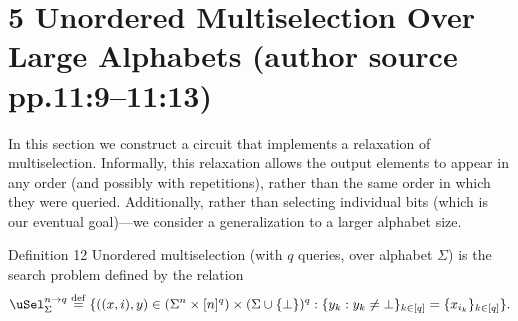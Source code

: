 \section*{5 Unordered Multiselection Over Large Alphabets (author source pp.11:9--11:13)}
In this section we construct a circuit that implements a relaxation of multiselection. Informally, this relaxation allows the output elements to appear in any order (and possibly with repetitions), rather than the same order in which they were queried. Additionally, rather than selecting individual bits (which is our eventual goal)---we consider a generalization to a larger alphabet size.
\begin{originalresult}{Definition 12}
Unordered multiselection (with $q$ queries, over alphabet $\Sigma$) is the search problem defined by the relation
\[\uSel_\Sigma^{n\to q}\stackrel{\rm def}=\{((x,i),y)\in(\Sigma^n\times[n]^q)\times(\Sigma\cup\{\bot\})^q:\{y_k:y_k\ne\bot\}_{k\in[q]}=\{x_{i_k}\}_{k\in[q]}\}.\]
\end{originalresult}
